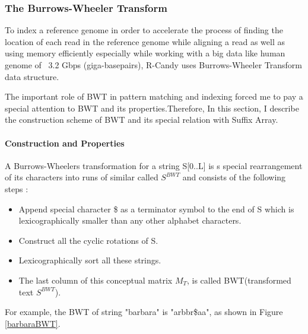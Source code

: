 \documentclass[11pt,a4paper]{report}
\begin{document}
\subsubsection{The Burrows-Wheeler Transform} \label{The Burrows-Wheeler Transform}

To index a reference genome in order to accelerate the process of finding the location of each read in the reference genome while aligning a read as well as using memory efficiently especially while working with a big data like human genome of ~3.2 Gbps (giga-basepairs), R-Candy uses Burrows-Wheeler Transform data structure.

The important role of BWT in pattern matching and indexing forced me to pay a special attention to BWT and its properties.Therefore, In this section, I describe the construction scheme of BWT and its special relation with Suffix Array.\\

\paragraph{Construction and Properties}

A Burrows-Wheelers transformation for a string S[0..L] is s special rearrangement of its characters into runs of similar called $S^{BWT}$ and consists of the following steps \cite{bwt}:

\begin{itemize} 
	\item Append special character \$ as a terminator symbol to the end of S which is lexicographically smaller than any other alphabet characters.
	\item  Construct all the cyclic rotations of S.
	\item  Lexicographically sort all these strings.
	\item The last column of this conceptual matrix \emph{$M_{T}$}, is called BWT(transformed text $S^{BWT}$).
\end{itemize}


For example, the BWT of string "barbara" is "arbbr\$aa", as shown in Figure \ref{barbaraBWT}.\\
\end{document}
